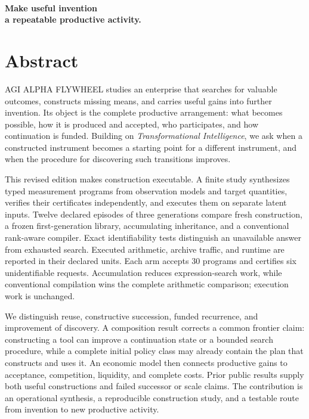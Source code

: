 \documentclass[10pt,a4paper]{article}
\newcommand{\smallcaps}[1]{{\sffamily\bfseries\textls[75]{\MakeUppercase{#1}}}}
\begin{document}
{\smallcaps{The thesis}}\\[2mm]
{\LARGE\sffamily\bfseries Make useful invention\\a repeatable productive activity.}
\vspace{4mm}

\section*{Abstract}
AGI ALPHA FLYWHEEL studies an enterprise that searches for valuable outcomes, constructs missing means, and carries useful gains into further invention. Its object is the complete productive arrangement: what becomes possible, how it is produced and accepted, who participates, and how continuation is funded. Building on \emph{Transformational Intelligence}, we ask when a constructed instrument becomes a starting point for a different instrument, and when the procedure for discovering such transitions improves.

This revised edition makes construction executable. A finite study synthesizes typed measurement programs from observation models and target quantities, verifies their certificates independently, and executes them on separate latent inputs. Twelve declared episodes of three generations compare fresh construction, a frozen first-generation library, accumulating inheritance, and a conventional rank-aware compiler. Exact identifiability tests distinguish an unavailable answer from exhausted search. Executed arithmetic, archive traffic, and runtime are reported in their declared units. Each arm accepts 30 programs and certifies six unidentifiable requests. Accumulation reduces expression-search work, while conventional compilation wins the complete arithmetic comparison; execution work is unchanged.

We distinguish reuse, constructive succession, funded recurrence, and improvement of discovery. A composition result corrects a common frontier claim: constructing a tool can improve a continuation state or a bounded search procedure, while a complete initial policy class may already contain the plan that constructs and uses it. An economic model then connects productive gains to acceptance, competition, liquidity, and complete costs. Prior public results supply both useful constructions and failed successor or scale claims. The contribution is an operational synthesis, a reproducible construction study, and a testable route from invention to new productive activity.
\end{document}
